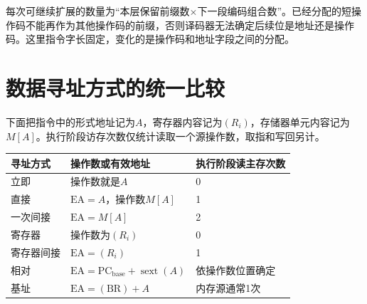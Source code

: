 每次可继续扩展的数量为“本层保留前缀数\ensuremath{\times}下一段编码组合数”。已经分配的短操作码不能再作为其他操作码的前缀，否则译码器无法确定后续位是地址还是操作码。这里指令字长固定，变化的是操作码和地址字段之间的分配。

\section{数据寻址方式的统一比较}\label{CO04-addressing-complete}

下面把指令中的形式地址记为\(A\)，寄存器内容记为\((R_i)\)，存储器单元内容记为\(M[A]\)。执行阶段访存次数仅统计读取一个源操作数，取指和写回另计。

\par\medskip\noindent\begin{minipage}{\linewidth}\fontsize{9.3}{12}\selectfont\begin{tabularx}{\linewidth}{@{}YYY@{}}
\toprule\noalign{}
\begin{minipage}[b]{\linewidth}\raggedright
寻址方式
\end{minipage} & \begin{minipage}[b]{\linewidth}\raggedright
操作数或有效地址
\end{minipage} & \begin{minipage}[b]{\linewidth}\raggedright
执行阶段读主存次数
\end{minipage} \\
\midrule\noalign{}


立即 & 操作数就是\(A\) & 0 \\
直接 & \(\mathrm{EA}=A\)，操作数\(M[A]\) & 1 \\
一次间接 & \(\mathrm{EA}=M[A]\) & 2 \\
寄存器 & 操作数为\((R_i)\) & 0 \\
寄存器间接 & \(\mathrm{EA}=(R_i)\) & 1 \\
相对 & \(\mathrm{EA}=\mathrm{PC}_{\mathrm{base}}+\operatorname{sext}(A)\) & 依操作数位置确定 \\
基址 & \(\mathrm{EA}=(\mathrm{BR})+A\) & 内存源通常1次 \\
\bottomrule\end{tabularx}
\end{minipage}\par\medskip

